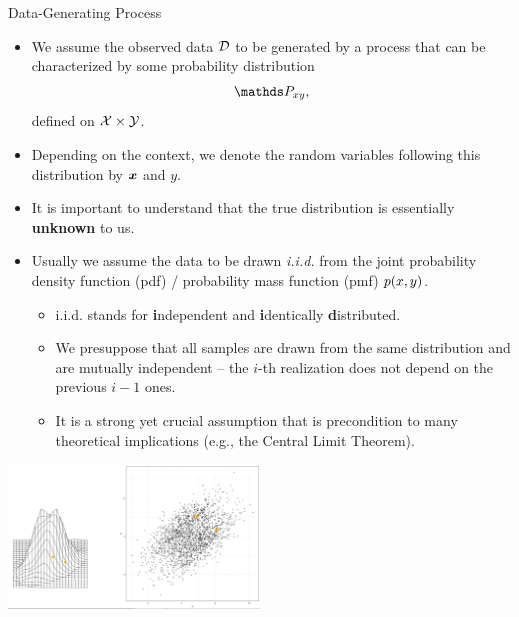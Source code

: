 \documentclass[11pt,compress,t,notes=noshow, xcolor=table]{beamer}
\begin{document}
\begin{vbframe}{Data-Generating Process}

\begin{itemize}

  \item We assume the observed data $\mathcal{D}$ to be generated by a process that can
  be characterized by some probability distribution $$\Pxy,$$ defined on 
  $\mathcal{X} \times \mathcal{Y}$.
  
  \item Depending on the context, we denote the random variables following this 
  distribution by $\bm{x}$ and $y$.
  
  \item It is important to understand that the true distribution is essentially 
  \textbf{unknown} to us.
  
  \framebreak
  
  \item Usually we assume the data to be drawn \emph{i.i.d.} from the joint 
  probability density function (pdf) / probability mass function (pmf) $p(x,y)$.
  
  \begin{itemize}
  
    \small
  
    \item i.i.d. stands for \textbf{i}ndependent and \textbf{i}dentically 
    \textbf{d}istributed.
    
    \item We presuppose that all samples are drawn from the same distribution 
    and are mutually independent -- the $i$-th realization does not depend on the
    previous $i-1$ ones.
    
    \item It is a strong yet crucial assumption that is precondition to many
    theoretical implications (e.g., the Central Limit Theorem).
    
    \normalsize
  
  \end{itemize}

\end{itemize}

\begin{center}
    \includegraphics[width = 0.5\textwidth]{figure/ml-basics-sample-from-dgp.PNG} 
  \end{center}


\end{vbframe}
\end{document}

